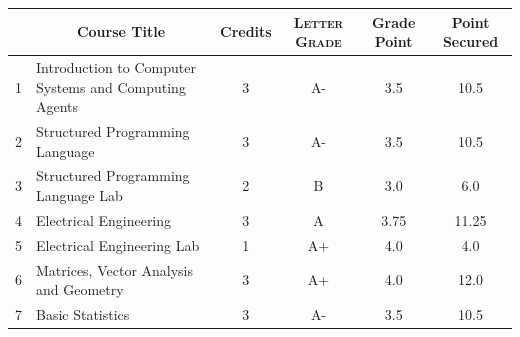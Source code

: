 \documentclass[11pt]{article}
\newcommand*{\numtwo}[1]{\pgfmathprintnumber[
                    fixed, precision=2, fixed zerofill=true]{#1}}
\begin{document}
                \begin{center}
                    \renewcommand{\arraystretch}{1.08}
                    
                \begin{tabular}{|c|l|c|>{\scshape}c|c|c|}
                \hline  \rule[-1ex]{0pt}{3.5ex} {\centering{\bf Course Code}} &  \multicolumn{1}{c|}{\textbf{Course Title}}  & {\bf Credits} & {\bf Letter Grade} & {\bf Grade Point} & {\bf Point Secured}  \\ 
                \hline   1 &  Introduction to Computer Systems and Computing Agents		 & 3 & A- & 3.5 & 10.5 \\ %
                \hline   2 &  Structured Programming Language		 & 3 & A- & 3.5 & 10.5 \\ %
                \hline   3 &  Structured Programming Language Lab		 & 2 & B & 3.0 & 6.0 \\ %
                \hline   4 &  Electrical Engineering		 & 3 & A & 3.75 & 11.25 \\ %
                \hline   5 &  Electrical Engineering Lab		 & 1 & A+ & 4.0 & 4.0 \\ %
                \hline   6 &  Matrices, Vector Analysis and Geometry		 & 3 & A+ & 4.0 & 12.0 \\ %
                \hline   7 &  Basic Statistics		 & 3 & A- & 3.5 & 10.5 \\ %

\hline                %
                \end{tabular}
                \end{center}
                \renewcommand{\arraystretch}{1.03}
\end{document}
